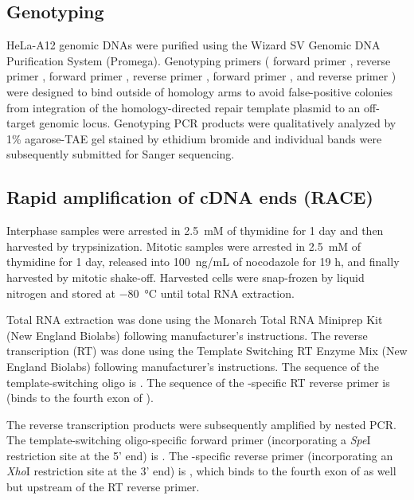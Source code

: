 \subsection{Genotyping}
HeLa-A12 genomic DNAs were purified using the Wizard SV Genomic DNA Purification System (Promega). Genotyping primers ( forward primer ,
 reverse primer ,
 forward primer ,
 reverse primer ,
 forward primer ,
and  reverse primer )
were designed to bind outside of homology arms to avoid false-positive colonies from integration of the homology-directed repair template plasmid to an off-target genomic locus. Genotyping PCR products were qualitatively analyzed by 1\% agarose-TAE gel stained by ethidium bromide and individual bands were subsequently submitted for Sanger sequencing.

\subsection{Rapid amplification of cDNA ends (RACE)}
Interphase samples were arrested in \SI{2.5}{mM} of thymidine for 1 day and then harvested by trypsinization. Mitotic samples were arrested in \SI{2.5}{mM} of thymidine for 1 day, released into \SI{100}{ng/mL} of nocodazole for 19 h, and finally harvested by mitotic shake-off. Harvested cells were snap-frozen by liquid nitrogen and stored at \SI{-80}{\celsius} until total RNA extraction.

Total RNA extraction was done using the Monarch Total RNA Miniprep Kit (New England Biolabs) following manufacturer’s instructions. The reverse transcription (RT) was done using the Template Switching RT Enzyme Mix (New England Biolabs) following manufacturer’s instructions. The sequence of the template-switching oligo is . The sequence of the -specific RT reverse primer is  (binds to the fourth exon of ).

The reverse transcription products were subsequently amplified by nested PCR. The template-switching oligo-specific forward primer (incorporating a \textit{Spe}I restriction site at the 5' end) is . The -specific reverse primer (incorporating an \textit{Xho}I restriction site at the 3' end) is , which binds to the fourth exon of  as well but upstream of the RT reverse primer.

